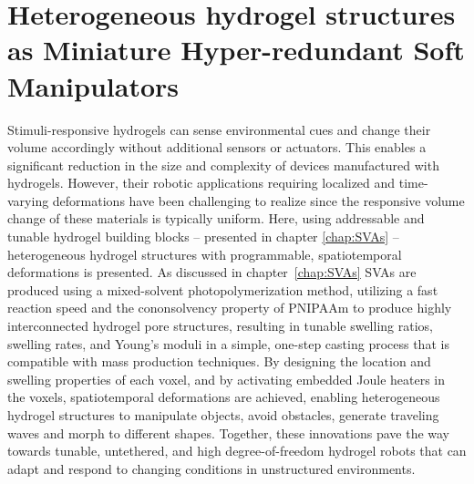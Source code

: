 \graphicspath{{Images/heterogeneous/}}

\chapter{Heterogeneous hydrogel structures as Miniature Hyper-redundant Soft Manipulators}
\label{chap:heterogeneous}
Stimuli-responsive hydrogels can sense environmental cues and change their volume accordingly without additional sensors or actuators. This enables a significant reduction in the size and complexity of devices manufactured with hydrogels. However, their robotic applications requiring localized and time-varying deformations have been challenging to realize since the responsive volume change of these materials is typically uniform. Here, using addressable and tunable hydrogel building blocks – presented in chapter \ref{chap:SVAs} – heterogeneous hydrogel structures with programmable, spatiotemporal deformations is presented. As discussed in chapter~\ref{chap:SVAs} SVAs are produced using a mixed-solvent photopolymerization method, utilizing a fast reaction speed and the cononsolvency property of PNIPAAm to produce highly interconnected hydrogel pore structures, resulting in tunable swelling ratios, swelling rates, and Young’s moduli in a simple, one-step casting process that is compatible with mass production techniques. By designing the location and swelling properties of each voxel, and by activating embedded Joule heaters in the voxels, spatiotemporal deformations are achieved, enabling heterogeneous hydrogel structures to manipulate objects, avoid obstacles, generate traveling waves and morph to different shapes. Together, these innovations pave the way towards tunable, untethered, and high degree-of-freedom hydrogel robots that can adapt and respond to changing conditions in unstructured environments.
